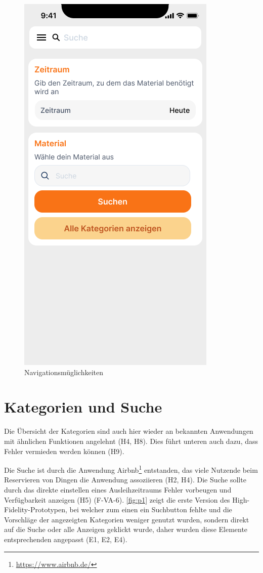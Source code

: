 \begin{figure}[h]
    \includegraphics[scale=0.4]{Bilder/Prototyp/Neu/Suche V2.png}
    \caption[Farbpalette]{Navigationsmüglichkeiten}
    \label{fig:nav}
\end{figure}

\section{Kategorien und Suche}
Die Übersicht der Kategorien sind auch hier wieder an bekannten
Anwendungen mit ähnlichen Funktionen angelehnt (H4, H8). Dies führt unteren auch dazu, dass Fehler 
vermieden werden können (H9). 

Die Suche ist durch die Anwendung Airbnb\footnote{\url{https://www.airbnb.de/}} entstanden, das
viele Nutzende beim Reservieren von Dingen die Anwendung assoziieren (H2, H4). Die Suche sollte
durch das direkte einstellen eines Ausleihzeitraums Fehler vorbeugen und Verfügbarkeit anzeigen
(H5) (F-VA-6). \ref{fig:p1} zeigt die erste Version des High-Fidelity-Prototypen, bei welcher zum einen ein
Suchbutton fehlte und die Vorschläge der angezeigten Kategorien weniger genutzt wurden, sondern
direkt auf die Suche oder alle Anzeigen geklickt wurde, daher wurden diese Elemente entsprechenden 
angepasst (E1, E2, E4).


